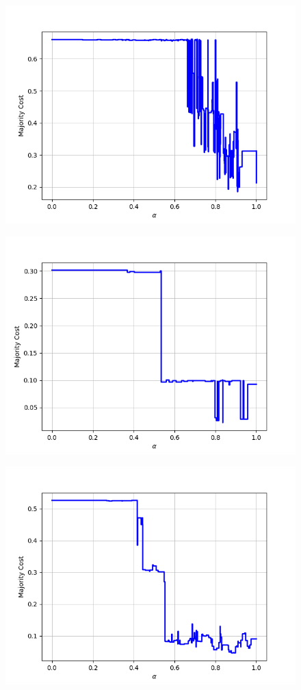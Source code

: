 \begin{figure}[h]
\begin{minipage}{.24\textwidth}
  {\includegraphics[width=\linewidth]{plots/nell-sc/creativework}}
\end{minipage}
\begin{minipage}{.24\textwidth}
  \centering
  {\includegraphics[width=\linewidth]{plots/nell-sc/date}}
\end{minipage}
\begin{minipage}{.24\textwidth}
  \centering
  {\includegraphics[width=\linewidth]{plots/nell-sc/event}}

\end{minipage}
\end{figure}
